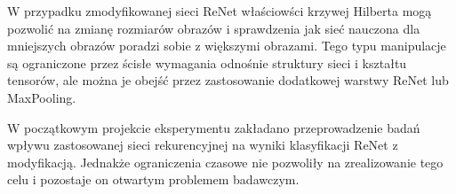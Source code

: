 \documentclass[oneside, mag]{mgr}
\begin{document}
W przypadku zmodyfikowanej sieci ReNet właściowści krzywej Hilberta mogą pozwolić na zmianę rozmiarów obrazów i sprawdzenia jak sieć nauczona dla mniejszych obrazów poradzi sobie z większymi obrazami. Tego typu manipulacje są ograniczone przez ścisłe wymagania odnośnie struktury sieci i kształtu tensorów, ale można je obejść przez zastosowanie dodatkowej warstwy ReNet lub MaxPooling.

W początkowym projekcie eksperymentu zakładano przeprowadzenie badań wpływu zastosowanej sieci rekurencyjnej na wyniki klasyfikacji ReNet z modyfikacją. Jednakże ograniczenia czasowe nie pozwoliły na zrealizowanie tego celu i pozostaje on otwartym problemem badawczym.



\listoffigures
\end{document}
